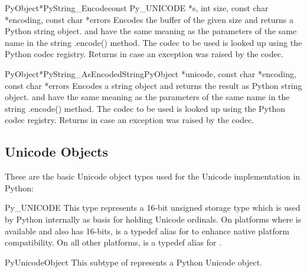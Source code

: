 \documentclass{manual}
\begin{document}
\begin{cfuncdesc}{PyObject*}{PyString_Encode}{const Py_UNICODE *s,
                                               int size,
                                               const char *encoding,
                                               const char *errors}
Encodes the  buffer of the given size and returns a
Python string object.  and  have the same
meaning as the parameters of the same name in the string .encode()
method. The codec to be used is looked up using the Python codec
registry. Returns \NULL{} in case an exception was raised by the
codec.
\end{cfuncdesc}

\begin{cfuncdesc}{PyObject*}{PyString_AsEncodedString}{PyObject *unicode,
                                               const char *encoding,
                                               const char *errors}
Encodes a string object and returns the result as Python string
object.  and  have the same meaning as the
parameters of the same name in the string .encode() method. The codec
to be used is looked up using the Python codec registry. Returns
\NULL{} in case an exception was raised by the codec.
\end{cfuncdesc}


\subsection{Unicode Objects \label{unicodeObjects}}


These are the basic Unicode object types used for the Unicode
implementation in Python:

\begin{ctypedesc}{Py_UNICODE}
This type represents a 16-bit unsigned storage type which is used by
Python internally as basis for holding Unicode ordinals. On platforms
where  is available and also has 16-bits,
 is a typedef alias for  to enhance
native platform compatibility. On all other platforms,
 is a typedef alias for .
\end{ctypedesc}

\begin{ctypedesc}{PyUnicodeObject}
This subtype of  represents a Python Unicode object.
\end{ctypedesc}
\end{document}
